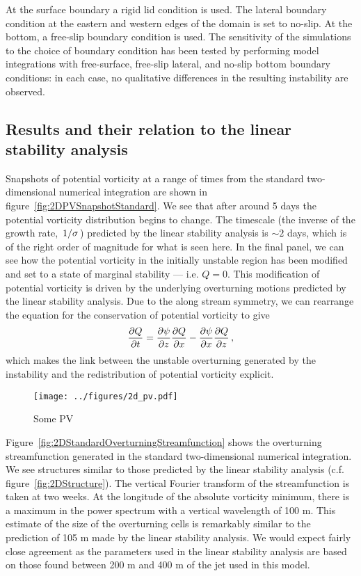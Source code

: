 At the surface boundary a rigid lid condition is used. The lateral boundary condition at the eastern and western edges of the domain is set to no-slip. At the bottom, a free-slip boundary condition is used. The sensitivity of the simulations to the choice of boundary condition has been tested by performing model integrations with free-surface, free-slip lateral, and no-slip bottom boundary conditions: in each case, no qualitative differences in the resulting instability are observed.

\subsection{Results and their relation to the linear stability analysis}
Snapshots of potential vorticity at a range of times from the standard two-dimensional numerical integration are shown in figure~\ref{fig:2DPVSnapshotStandard}. We see that after around 5 days the potential vorticity distribution begins to change. The timescale (the inverse of the growth rate, $\flatfrac{1}{\sigma}$) predicted by the linear stability analysis is $\sim 2$ days, which is of the right order of magnitude for what is seen here. In the final panel, we can see how the potential vorticity in the initially unstable region has been modified and set to a state of marginal stability --- i.e. $Q = 0$. This modification of potential vorticity is driven by the underlying overturning motions predicted by the linear stability analysis. Due to the along stream symmetry, we can rearrange the equation for the conservation of potential vorticity to give
\begin{equation}
    \label{eq:PVEvolution}
    \pdv{Q}{t} = \pdv{\psi}{z}\pdv{Q}{x} - \pdv{\psi}{x}\pdv{Q}{z} \, ,%
\end{equation}
which makes the link between the unstable overturning generated by the instability and the redistribution of potential vorticity explicit\footnotemark.

\begin{figure}
    \centering
    \texttt{[image: ../figures/2d\_pv.pdf]}
    \caption{Some PV}
    \label{fig:2DPVSnapshotsStandard}
\end{figure}


Figure~\ref{fig:2DStandardOverturningStreamfunction} shows the overturning streamfunction generated in the standard two-dimensional numerical integration. We see structures similar to those predicted by the linear stability analysis (c.f. figure~\ref{fig:2DStructure}). The vertical Fourier transform of the streamfunction is taken at two weeks. At the longitude of the absolute vorticity minimum, there is a maximum in the power spectrum with a vertical wavelength of 100 m. This estimate of the size of the overturning cells is remarkably similar to the prediction of 105 m made by the linear stability analysis. We would expect fairly close agreement as the parameters used in the linear stability analysis are based on those found between 200 m and 400 m of the jet used in this model.

